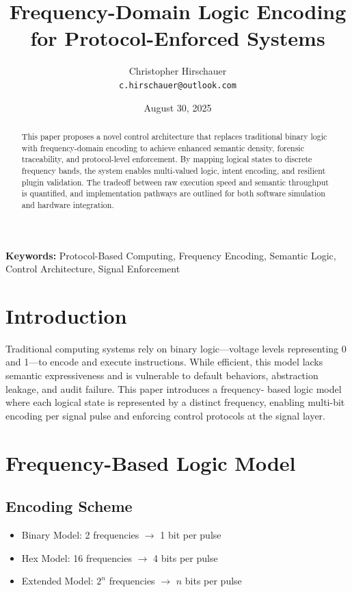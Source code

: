 \documentclass[11pt]{article}
\title{Frequency-Domain Logic Encoding for Protocol-Enforced Systems}
\author{Christopher Hirschauer \\ \texttt{c.hirschauer@outlook.com}}
\date{August 30, 2025}
\begin{document}
\maketitle

\begin{abstract}
This paper proposes a novel control architecture that replaces traditional binary logic with
frequency-domain encoding to achieve enhanced semantic density, forensic traceability, and
protocol-level enforcement. By mapping logical states to discrete frequency bands, the system
enables multi-valued logic, intent encoding, and resilient plugin validation. The tradeoff between
raw execution speed and semantic throughput is quantified, and implementation pathways are
outlined for both software simulation and hardware integration.
\end{abstract}

\noindent
\textbf{Keywords:} Protocol-Based Computing, Frequency Encoding, Semantic Logic, Control Architecture, Signal Enforcement

\section{Introduction}
Traditional computing systems rely on binary logic—voltage levels representing 0 and 1—to encode
and execute instructions. While efficient, this model lacks semantic expressiveness and is vulnerable
to default behaviors, abstraction leakage, and audit failure. This paper introduces a frequency-
based logic model where each logical state is represented by a distinct frequency, enabling multi-bit
encoding per signal pulse and enforcing control protocols at the signal layer.

\section{Frequency-Based Logic Model}

\subsection{Encoding Scheme}
\begin{itemize}
  \item Binary Model: 2 frequencies $\rightarrow$ 1 bit per pulse
  \item Hex Model: 16 frequencies $\rightarrow$ 4 bits per pulse
  \item Extended Model: $2^n$ frequencies $\rightarrow$ $n$ bits per pulse
\end{itemize}
\end{document}
